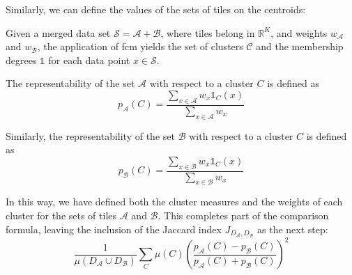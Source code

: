 \bigskip \noindent Similarly, we can define the values of the sets of tiles on the centroids:
\begin{toReview}
\begin{definition}
	\label{def:weightovercluster}
	Given a merged data set $\mathcal{S}=\mathcal{A}+\mathcal{B}$, where tiles belong in $\mathbb{R}^K$, and weights $w_\mathcal{A}$ and $w_\mathcal{B}$, the application of \gls{fcm} yields the set of clusters $\mathcal{C}$ and the membership degrees $\mathds{1}$ for each data point $x\in\mathcal{S}$.

	\noindent The representability of the set $\mathcal{A}$ with respect to a cluster $C$ is defined as
	$$ p_\mathcal{A}(C) = \frac{\sum_{x\in\mathcal{A}} w_x\mathds{1}_C(x)}{\sum_{x\in\mathcal{A}} w_x} $$

	\noindent Similarly, the representability of the set $\mathcal{B}$ with respect to a cluster $C$ is defined as
	$$ p_\mathcal{B}(C) = \frac{\sum_{x\in\mathcal{B}} w_x\mathds{1}_C(x)}{\sum_{x\in\mathcal{B}} w_x} $$
\end{definition}

\noindent In this way, we have defined both the cluster measures and the weights of each cluster for the sets of tiles $\mathcal{A}$ and $\mathcal{B}$. This completes part of the comparison formula, leaving the inclusion of the Jaccard index $J_{D_\mathcal{A},D_\mathcal{B}}$ as the next step:
\[
	\frac{1}{\mu(D_\mathcal{A} \cup D_\mathcal{B})} \sum_C \mu(C) \left(\frac{p_\mathcal{A}(C) - p_\mathcal{B}(C)}{p_\mathcal{A}(C) + p_\mathcal{B}(C)}\right)^2
\]
\end{toReview}

